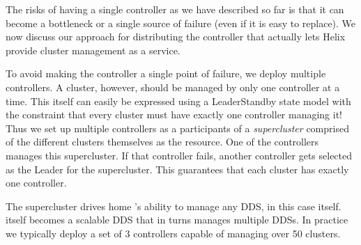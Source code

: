 The risks of having a single controller as we have described so far is that it
can become a bottleneck or a single source of failure (even if it is easy to
replace).  We now discuss our approach for distributing the controller that
actually lets Helix provide cluster management as a service. 

To avoid making the controller a single point of failure, we deploy multiple
controllers. A cluster, however, should be managed by only one controller at a time. 
This itself can easily be expressed using a LeaderStandby state model with the constraint 
that every cluster must have exactly one controller managing it! Thus we set up multiple 
controllers as a participants of a \emph{supercluster} comprised of the different clusters 
themselves as the resource. One of the controllers manages this supercluster. If that controller 
fails, another controller gets selected as the Leader for the supercluster. This
guarantees that each cluster has exactly one controller.  

The supercluster drives home \helix's ability to manage any DDS, in this case
itself.  \helix itself becomes a scalable DDS that in turns manages multiple DDSs. 
In practice we typically deploy a set of 3 controllers capable of managing over
50 clusters. 

